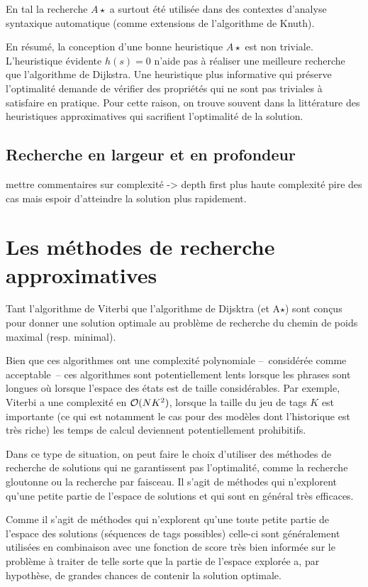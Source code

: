 \documentclass[11pt,openany]{book}
\newcommand{\ac}[1]{{\sc #1}} %
\begin{document}
En \ac{tal} la recherche $A\star$ a surtout été utilisée dans des
contextes d'analyse syntaxique automatique (comme extensions de
l'algorithme de Knuth).

En résumé, la conception d'une bonne heuristique $A\star$ est non
triviale. L'heuristique évidente $h(s) = 0$ n'aide pas à réaliser une
meilleure recherche que l'algorithme de Dijkstra. Une heuristique plus informative qui préserve
l'optimalité demande de vérifier des propriétés qui ne sont pas
triviales à satisfaire en pratique. Pour cette raison, on trouve
souvent dans la littérature des heuristiques approximatives qui sacrifient l'optimalité de la solution.


\subsection{Recherche en largeur et en profondeur}
mettre commentaires sur complexité -> depth first plus haute
complexité pire des cas mais espoir d'atteindre la solution plus rapidement.

\section{Les méthodes de recherche approximatives}

Tant l'algorithme de Viterbi que l'algorithme de Dijsktra (et
A$\star$) sont conçus pour donner une solution optimale au problème de
recherche du chemin de poids maximal (resp. minimal).

Bien que ces algorithmes ont une complexité polynomiale --~considérée
comme acceptable~-- ces algorithmes sont potentiellement lents lorsque
les phrases sont longues où lorsque l'espace des états est de taille
considérables. Par exemple, Viterbi a une complexité en ${\cal
  O}(NK^2)$, lorsque la taille du jeu de tags $K$ est importante (ce
qui est notamment le cas pour des modèles dont l'historique est très riche)
les temps de calcul deviennent potentiellement prohibitifs.

Dans ce type de situation, on peut faire le choix d'utiliser des
méthodes de recherche de solutions qui ne garantissent pas
l'optimalité, comme la recherche gloutonne ou la recherche par
faisceau. Il s'agit de méthodes qui n'explorent qu'une petite partie
de l'espace de solutions et qui sont en général très efficaces.

Comme il s'agit de méthodes qui n'explorent qu'une toute petite
partie de l'espace des solutions (séquences de tags possibles)
celle-ci sont généralement utilisées en combinaison avec une fonction
de score très bien informée sur le problème à traiter de telle sorte que la
partie de l'espace explorée a, par hypothèse, de grandes chances de contenir la
solution optimale. 
\end{document}
